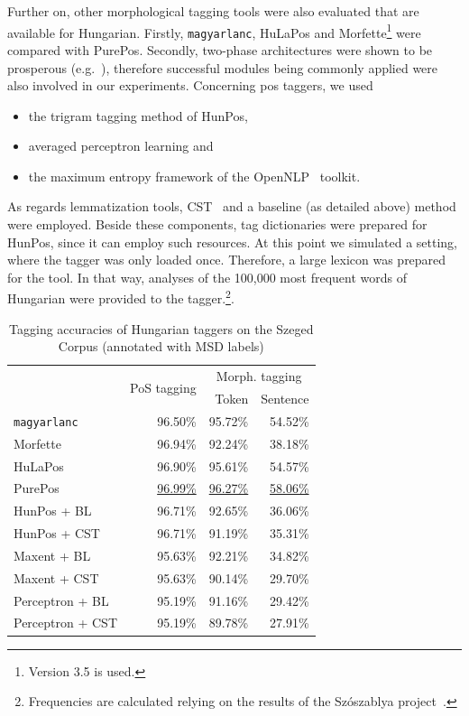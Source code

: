 Further on, other morphological tagging tools were also evaluated that are available for Hungarian. 
Firstly, \texttt{magyarlanc}, HuLaPos and Morfette\footnote{Version 3.5 is used.} were compared with PurePos.  
Secondly, two-phase architectures were shown to be prosperous (e.g.~\cite{Agic2013,Erjavec2004}), therefore successful modules being commonly applied were also involved in our experiments. 
Concerning \gls{pos} taggers, we used
\begin{itemize}
  \item the trigram tagging method of HunPos,
  \item averaged perceptron learning and
  \item the maximum entropy framework of the OpenNLP~\cite{Baldridge2002} toolkit.
\end{itemize}

As regards lemmatization tools, CST~\cite{Jongejan} and a baseline (as detailed above) method were employed. 
Beside these components, tag dictionaries were prepared for HunPos, since it can employ such resources.  
At this point we simulated a setting, where the tagger was only loaded once.
Therefore, a large lexicon was prepared for the tool.
In that way, analyses of the 100,000 most frequent words of Hungarian were provided to the tagger.\footnote{Frequencies are calculated relying on the results of the Szószablya project~\cite{Halacsy2004}.}.


\begin{table}[H]
 \centering
 \caption{Tagging accuracies of Hungarian taggers on the Szeged Corpus (annotated with MSD labels)}
\begin{tabular}{l r r r}
  \hline
   & \multirow{2}{*}{PoS tagging} & \multicolumn{2}{c}{Morph. tagging} \\
   & &  Token &  Sentence \\
  \hline
  \texttt{magyarlanc} &  96.50\% &  95.72\% &  54.52\% \\
  Morfette &  96.94\% &  92.24\% &  38.18\% \\
  HuLaPos &  96.90\% &   95.61\% & 54.57\% \\
  PurePos &  \underline{96.99\%} &  \underline{96.27\%} &  \underline{58.06\%} \\
  HunPos + BL &  96.71\% &  92.65\% &  36.06\% \\
  HunPos + CST &  96.71\% &  91.19\% &  35.31\% \\
  Maxent + BL &  95.63\% &  92.21\% &  34.82\% \\
  Maxent + CST &  95.63\% &  90.14\% &  29.70\% \\
  Perceptron + BL &  95.19\% &  91.16\% &  29.42\% \\
  Perceptron + CST &  95.19\% &  89.78\% &  27.91\% \\
  \hline
\end{tabular}
\label{tab:morphtag-orig}
\end{table}


